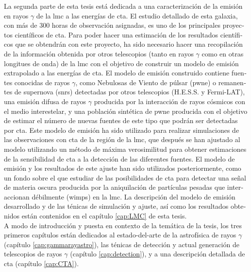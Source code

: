 \documentclass[main.tex]{subfiles}
\begin{document}
\begin{otherlanguage}{spanish}
La segunda parte de esta tesis está dedicada a una caracterización de la emisión en rayos $\gamma$ de la \gls{lmc} a las energías de \gls{cta}. El estudio detallado de esta galaxia, con más de 300 horas de observación asignadas, es uno de los principales proyectos científicos de \gls{cta}. Para poder hacer una estimación de los resultados científicos que se obtendrán con este proyecto, ha sido necesario hacer una recopilación de la información obtenida por otros telescopios (tanto en rayos $\gamma$ como en otras longitues de onda) de la \gls{lmc} con el objetivo de construir un modelo de emisión extrapolado a las energías de \gls{cta}. El modelo de emisión construido contiene fuentes conocidas de rayos $\gamma$, como Nebulosas de Viento de púlsar (\gls{pwne}) o remanentes de supernova (\glspl{snr}) detectadas por otros telescopios (H.E.S.S. y Fermi-LAT), una emisión difusa de rayos $\gamma$ producida por la interacción de rayos cósmicos con el medio interestelar, y una población sintética de \gls{pwne} producida con el objetivo de estimar el número de nuevas fuentes de este tipo que podrán ser detectadas por \gls{cta}. Este modelo de emisión ha sido utilizado para realizar simulaciones de las observaciones con \gls{cta} de la región de la \gls{lmc}, que después se han ajustado al modelo utilizando un método de máxima verosimilitud para obtener estimaciones de la sensibilidad de \gls{cta} a la detección de las diferentes fuentes. El modelo de emisión y los resultados de este ajuste han sido utilizados posteriormente, como un fondo sobre el que estudiar de las posibilidades de \gls{cta} para detectar una señal de materia oscura producida por la aniquilación de partículas pesadas que interaccionan débilmente (\glspl{wimp}) en la \gls{lmc}. La descripción del modelo de emisión desarrollado y de las ténicas de simulación y ajuste, así como los resultados obtenidos están contenidos en el capítulo \ref{cap:LMC} de esta tesis. 
\\

A modo de introducción y puesta en contexto de la temática de la tesis, los tres primeros capítulos están dedicados al estado-del-arte de la astrofísica de rayos $\gamma$ (capítulo \ref{cap:gammarayastro}), las ténicas de detección y actual generación de telescopios de rayos $\gamma$ (capítulo \ref{cap:detection}), y a una descripción detallada de \gls{cta} (capítulo \ref{cap:CTA}). 
\end{otherlanguage}
\end{document}
